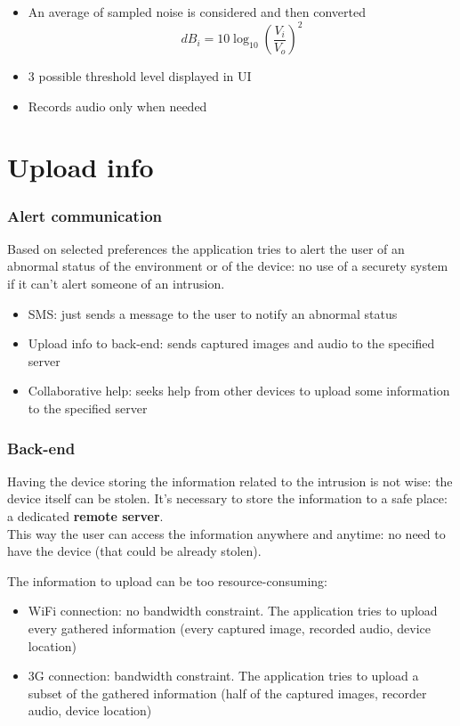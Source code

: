 \documentclass{beamer}
\begin{document}
\begin{frame}
\begin{minipage}[c]{.25\textwidth}
\end{minipage}\begin{minipage}[c]{.65\textwidth}
\begin{itemize}
  \item An average of sampled noise is considered and then converted
    {\footnotesize\[dB_i = 10\log_{10} \left(\frac{V_i}{V_o}\right)^2\]}
  \item 3 possible threshold level displayed in UI
  \item Records audio only when needed
\end{itemize}
\end{minipage}
\end{frame}


\section{Upload info}
\begin{frame}
\frametitle{Alert communication}
\begin{block}{}
Based on selected preferences the application tries to alert the user of an abnormal status of the environment or of the device: no use of a securety system if it can't alert someone of an intrusion.
\end{block}
\begin{itemize}
  \item SMS: just sends a message to the user to notify an abnormal status
  \item Upload info to back-end: sends captured images and audio to the specified server
  \item Collaborative help: seeks help from other devices to upload some information to the specified server
\end{itemize}
\end{frame}

\begin{frame}
\frametitle{Back-end}
\begin{block}{}
Having the device storing the information related to the intrusion is not wise: the device itself can be stolen. It's necessary to store the information to a safe place: a dedicated \textbf{remote server}.\\This way the user can access the information anywhere and anytime: no need to have the device (that could be already stolen).
\end{block}
The information to upload can be too resource-consuming:
\begin{itemize}
  \item WiFi connection: no bandwidth constraint. The application tries to upload every gathered information (every captured image, recorded audio, device location)
  \item 3G connection: bandwidth constraint. The application tries to upload a subset of the gathered information (half of the captured images, recorder audio, device location)
\end{itemize}
\end{frame}
\end{document}
